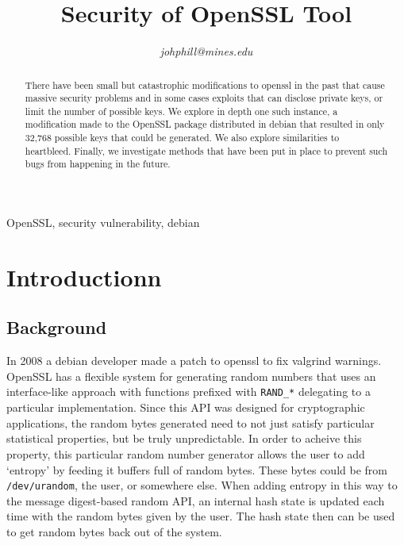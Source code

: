 \documentclass[conference]{IEEEtran}
\begin{document}
\title{Security of OpenSSL Tool}

\author{
\textit{johphill@mines.edu}\\
\and
{}
\and
{}
\and
{}
\and
{}
\and
{}
}

\maketitle

\begin{abstract}
There have been small but catastrophic modifications to openssl in the
past\cite{1}\cite{2}\cite{5} that cause massive security problems and
in some cases exploits that can disclose private keys, or limit the
number of possible keys. We explore in depth one such instance, a
modification made to the OpenSSL package distributed in debian that
resulted in only 32,768 possible keys that could be generated. We also
explore similarities to heartbleed. Finally, we investigate methods
that have been put in place to prevent such bugs from happening in the
future.
\end{abstract}

\begin{IEEEkeywords}
OpenSSL, security vulnerability, debian
\end{IEEEkeywords}

\section{Introductionn}
\subsection{Background}
In 2008 a debian developer made a patch to openssl to fix valgrind
warnings\cite{2}\cite{3}. OpenSSL has a flexible system for generating
random numbers that uses an interface-like approach with functions
prefixed with \verb|RAND_*| delegating to a particular
implementation. Since this API was designed for cryptographic
applications, the random bytes generated need to not just satisfy
particular statistical properties, but be truly unpredictable. In order
to acheive this property, this particular random number generator
allows the user to add `entropy' by feeding it buffers full of random
bytes. These bytes could be from \verb|/dev/urandom|, the user, or
somewhere else. When adding entropy in this way to the message
digest-based random API, an internal hash state is updated each time
with the random bytes given by the user. The hash state then can be
used to get random bytes back out of the system. 
\end{document}
